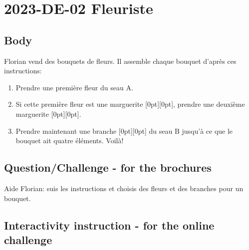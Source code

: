 \documentclass[a4paper,11pt]{report}
\newcommand{\taskGraphicsFolder}{..}
\begin{document}
\section*{\centering{} 2023-DE-02 Fleuriste}


\subsection*{Body}

{\centering%
\par}

Florian vend des bouquets de fleurs. Il assemble chaque bouquet d’après ces instructions:

\begin{enumerate}
  \item Prendre une première fleur du seau A.
  \item Si cette première fleur est une marguerite \raisebox{\dimexpr -0.5ex -1.0ex \relax}[0pt][0pt]{}, prendre une deuxième marguerite \raisebox{\dimexpr -0.5ex -1.0ex \relax}[0pt][0pt]{}.
  \item Prendre maintenant une branche \raisebox{\dimexpr -0.5ex -0.5ex \relax}[0pt][0pt]{} du seau B jusqu’à ce que le bouquet ait quatre éléments. Voilà!
\end{enumerate}

{\em


\subsection*{Question/Challenge - for the brochures}

Aide Florian: suis les instructions et choisis des fleurs et des branches pour un bouquet.

{\centering%
\par}

}


\subsection*{Interactivity instruction - for the online challenge}
\end{document}
